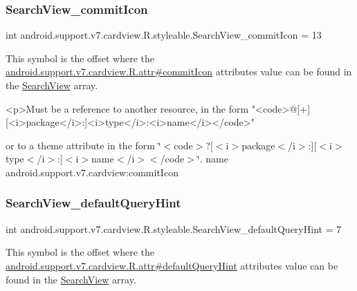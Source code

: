 \subsubsection{\texorpdfstring{Search\+View\+\_\+commit\+Icon}{SearchView\_commitIcon}}
{\footnotesize\ttfamily int android.\+support.\+v7.\+cardview.\+R.\+styleable.\+Search\+View\+\_\+commit\+Icon = 13\hspace{0.3cm}{\ttfamily [static]}}

This symbol is the offset where the \hyperlink{classandroid_1_1support_1_1v7_1_1cardview_1_1R_1_1attr_a279c2fff10e4895b410724ac6530869c}{android.\+support.\+v7.\+cardview.\+R.\+attr\#commit\+Icon} attribute\textquotesingle{}s value can be found in the \hyperlink{classandroid_1_1support_1_1v7_1_1cardview_1_1R_1_1styleable_a6a300ecad88f70a7642265f73ff4d33f}{Search\+View} array.

\begin{DoxyVerb}      <p>Must be a reference to another resource, in the form "<code>@[+][<i>package</i>:]<i>type</i>:<i>name</i></code>"
\end{DoxyVerb}
 or to a theme attribute in the form \char`\"{}$<$code$>$?\mbox{[}$<$i$>$package$<$/i$>$\+:\mbox{]}\mbox{[}$<$i$>$type$<$/i$>$\+:\mbox{]}$<$i$>$name$<$/i$>$$<$/code$>$\char`\"{}.  name android.\+support.\+v7.\+cardview\+:commit\+Icon \mbox{\label{classandroid_1_1support_1_1v7_1_1cardview_1_1R_1_1styleable_a66b7049f102d587dd7b8ce1ae08d136e}} 
\subsubsection{\texorpdfstring{Search\+View\+\_\+default\+Query\+Hint}{SearchView\_defaultQueryHint}}
{\footnotesize\ttfamily int android.\+support.\+v7.\+cardview.\+R.\+styleable.\+Search\+View\+\_\+default\+Query\+Hint = 7\hspace{0.3cm}{\ttfamily [static]}}

This symbol is the offset where the \hyperlink{classandroid_1_1support_1_1v7_1_1cardview_1_1R_1_1attr_a48bf1b18dbbe3f6b6ec0ba59da897ce9}{android.\+support.\+v7.\+cardview.\+R.\+attr\#default\+Query\+Hint} attribute\textquotesingle{}s value can be found in the \hyperlink{classandroid_1_1support_1_1v7_1_1cardview_1_1R_1_1styleable_a6a300ecad88f70a7642265f73ff4d33f}{Search\+View} array.

